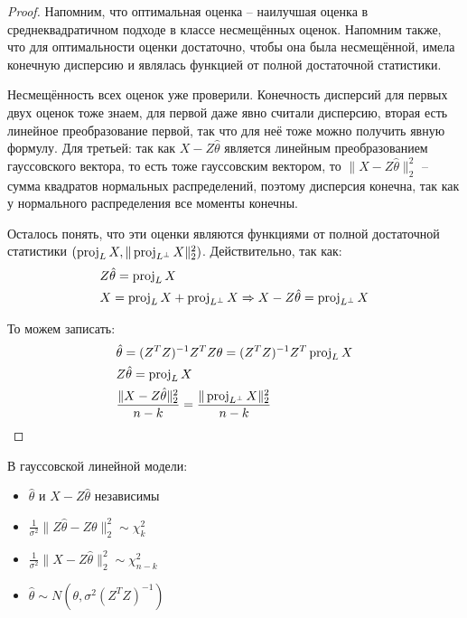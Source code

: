 \begin{proof}
    Напомним, что оптимальная оценка -- наилучшая оценка в среднеквадратичном подходе в классе несмещённых оценок. Напомним также, что для оптимальности оценки достаточно, чтобы она была несмещённой, имела конечную дисперсию и являлась функцией от полной достаточной статистики.

    Несмещённость всех оценок уже проверили. Конечность дисперсий для первых двух оценок тоже знаем, для первой даже явно считали дисперсию, вторая есть линейное преобразование первой, так что для неё тоже можно получить явную формулу. Для третьей: так как $X - Z\hat{\theta}$ является линейным преобразованием гауссовского вектора, то есть тоже гауссовским вектором, то $\|X - Z \hat{\theta}\|_2^2$ -- сумма квадратов нормальных распределений, поэтому дисперсия конечна, так как у нормального распределения все моменты конечны.

    Осталось понять, что эти оценки являются функциями от полной достаточной статистики $(\operatorname{proj}_L X, \|\operatorname{proj}_{L^\perp} X\|_2^2)$. Действительно, так как:
    \begin{align*}
        & Z\hat{\theta} = \operatorname{proj}_L X
        \\
        & X = \operatorname{proj}_L X + \operatorname{proj}_{L^\perp} X \Rightarrow X - Z \hat{\theta} = \operatorname{proj}_{L^\perp} X
    \end{align*}

    То можем записать:
    \begin{align*}
        & \hat{\theta} = (Z^T Z)^{-1} Z^T Z \theta = (Z^T Z)^{-1} Z^T \operatorname{proj}_L X
        \\
        & Z\hat{\theta} = \operatorname{proj}_L X
        \\
        & \frac{\|X - Z \hat{\theta}\|_2^2}{n-k} = \frac{\|\operatorname{proj}_{L^\perp} X\|_2^2}{n-k}
    \end{align*}
\end{proof}

\begin{proposition}
    В гауссовской линейной модели:
    \begin{itemize}
        \item $\hat{\theta}$ и $X - Z \hat{\theta}$ независимы
        \item $\frac{1}{\sigma^2} \|Z \hat{\theta} - Z \theta\|_2^2 \sim \chi^2_k$
        \item $\frac{1}{\sigma^2} \|X - Z\hat{\theta}\|_2^2 \sim \chi^2_{n-k}$
        \item $\hat{\theta} \sim N(\theta, \sigma^2 (Z^T Z)^{-1})$
    \end{itemize}
\end{proposition}


